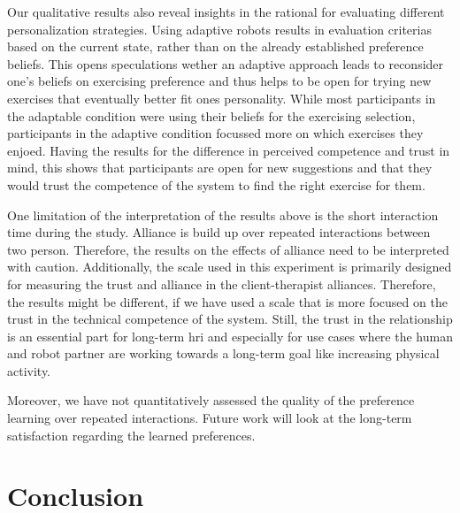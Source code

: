 \documentclass[twocolumn]{svjour3}          %
\begin{document}
Our qualitative results also reveal insights in the rational for evaluating different personalization strategies. Using adaptive robots results in evaluation criterias based on the current state, rather than on the already established preference beliefs. This opens speculations wether an adaptive approach leads to reconsider one's beliefs on exercising preference and thus helps to be open for trying new exercises that eventually better fit ones personality. While most participants in the adaptable condition were using their beliefs for the exercising selection, participants in the adaptive condition focussed more on which exercises they enjoed. Having the results for the difference in perceived competence and trust in mind, this shows that participants are open for new suggestions and that they would trust the competence of the system to find the right exercise for them.

One limitation of the interpretation of the results above is the short interaction time during the study. Alliance is build up over repeated interactions between two person. Therefore, the results on the effects of alliance need to be interpreted with caution. Additionally, the scale used in this experiment is primarily designed for measuring the trust and alliance in the client-therapist alliances. Therefore, the results might be different, if we have used a scale that is more focused on the trust in the technical competence of the system. Still, the trust in the relationship is an essential part for long-term \gls{hri} and especially for use cases where the human and robot partner are working towards a long-term goal like increasing physical activity.

Moreover, we have not quantitatively assessed the quality of the preference learning over repeated interactions. Future work will look at the long-term satisfaction regarding the learned preferences. 

\hypertarget{conclusion}{%
\section{\texorpdfstring{Conclusion
\label{adaptation:sec:conclusion}}{Conclusion }}\label{conclusion}}
\end{document}

